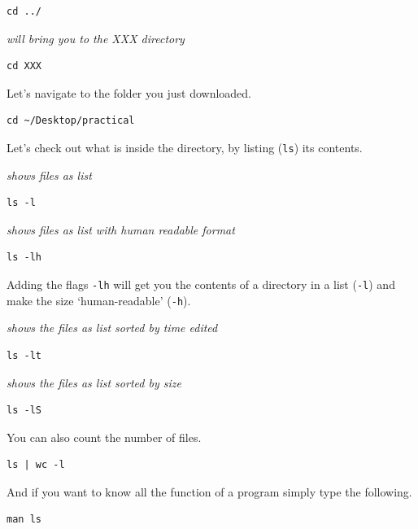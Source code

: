 \documentclass[
]{book}
\newcommand{\passthrough}[1]{#1}
\begin{document}
\begin{lstlisting}
cd ../ 
\end{lstlisting}

\emph{will bring you to the XXX directory}

\begin{lstlisting}
cd XXX 
\end{lstlisting}

Let's navigate to the folder you just downloaded.

\begin{lstlisting}
cd ~/Desktop/practical
\end{lstlisting}

Let's check out what is inside the directory, by listing (\passthrough{\lstinline!ls!}) its contents.

\emph{shows files as list}

\begin{lstlisting}
ls -l 
\end{lstlisting}

\emph{shows files as list with human readable format }

\begin{lstlisting}
ls -lh 
\end{lstlisting}

Adding the flags \passthrough{\lstinline!-lh!} will get you the contents of a directory in a list (\passthrough{\lstinline!-l!}) and make the size `human-readable' (\passthrough{\lstinline!-h!}).

\emph{shows the files as list sorted by time edited}

\begin{lstlisting}
ls -lt 
\end{lstlisting}

\emph{shows the files as list sorted by size}

\begin{lstlisting}
ls -lS 
\end{lstlisting}

You can also count the number of files.

\begin{lstlisting}
ls | wc -l
\end{lstlisting}

And if you want to know all the function of a program simply type the following.

\begin{lstlisting}
man ls
\end{lstlisting}
\end{document}
